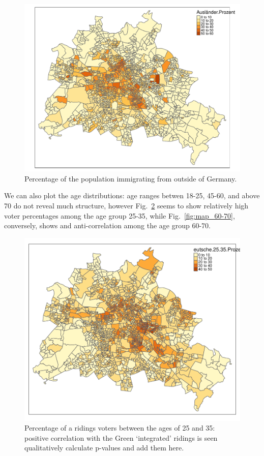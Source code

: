 \documentclass[amsmath,amssymb,nofootinbib,12pt,preprint]{revtex4}
\begin{document}
\begin{figure}[h]%
\includegraphics[scale=.65]{../figures/map_auslaender_prozent}%
\caption{ Percentage of the population immigrating from outside of Germany.}
\label{fig:map_immigrant}%
\end{figure}

We can also plot the age distributions: age ranges betwen 18-25, 45-60, and above 70 do not reveal much structure, however Fig.~\ref{fig:map_25-35} seems to show relatively high voter percentages among the age group 25-35, while Fig.~\ref{fig:map_60-70}, conversely, shows and anti-correlation among the age group 60-70.

\begin{figure}[h]%
\includegraphics[scale=.65]{../figures/map_25-35}%
\caption{ Percentage of a ridings voters between the ages of 25 and 35: positive correlation with the Green `integrated' ridings is seen qualitatively {\color{red} calculate p-values and add them here}.}
\label{fig:map_25-35}%
\end{figure}
\end{document}
